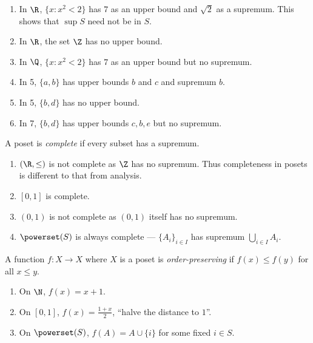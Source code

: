 \documentclass[a4paper]{article}
\begin{document}
\begin{eg}\leavevmode
  \begin{enumerate}
  \item In \(\R\), \(\{x: x^2 < 2\}\) has \(7\) as an upper bound and \(\sqrt 2\) as a supremum. This shows that \(\sup S\) need not be in \(S\).
  \item In \(\R\), the set \(\Z\) has no upper bound.
  \item In \(\Q\), \(\{x: x^2 < 2\}\) has \(7\) as an upper bound but no supremum.
  \item In 5, \(\{a, b\}\) has upper bounds \(b\) and \(c\) and supremum \(b\).
  \item In 5, \(\{b, d\}\) has no upper bound.
  \item In 7, \(\{b, d\}\) has upper bounds \(c, b, e\) but no supremum.
  \end{enumerate}
\end{eg}

\begin{definition}[Completeness]
  A poset is \emph{complete} if every subset has a supremum.
\end{definition}

\begin{eg}\leavevmode
  \begin{enumerate}
  \item \((\R, \leq)\) is not complete as \(\Z\) has no supremum. Thus completeness in posets is different to that from analysis.
  \item \([0, 1]\) is complete.
  \item \((0, 1)\) is not complete as \((0, 1)\) itself has no supremum.
  \item \(\powerset(S)\) is always complete --- \(\{A_i\}_{i \in I}\) has supremum \(\bigcup_{i \in I} A_i\).
  \end{enumerate}
\end{eg}

\begin{definition}
  A function \(f: X \to X\) where \(X\) is a poset is \emph{order-preserving} if \(f(x) \leq f(y)\) for all \(x \leq y\).
\end{definition}

\begin{eg}\leavevmode
  \begin{enumerate}
  \item On \(\N\), \(f(x) = x + 1\).
  \item On \([0, 1]\), \(f(x) = \frac{1 + x}{2}\), ``halve the distance to \(1\)''.
  \item On \(\powerset(S)\), \(f(A) = A \cup \{i\}\) for some fixed \(i \in S\).
  \end{enumerate}
\end{eg}
\end{document}
